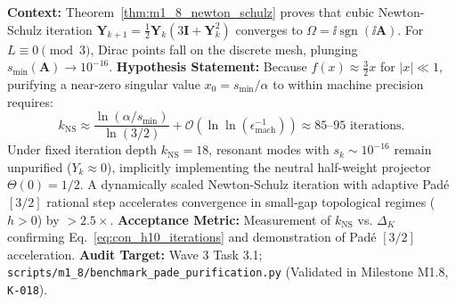 \begin{contract}
\label{con:h10_newton_schulz_complexity}
\textbf{Context:} Theorem~\ref{thm:m1_8_newton_schulz} proves that cubic Newton-Schulz iteration $\mathbf{Y}_{k+1} = \frac{1}{2}\mathbf{Y}_k(3\mathbf{I} + \mathbf{Y}_k^2)$ converges to $\Omega = \ii \operatorname{sgn}(\ii\mathbf{A})$. For $L \equiv 0 \pmod 3$, Dirac points fall on the discrete mesh, plunging $s_{\min}(\mathbf{A}) \to 10^{-16}$.
\textbf{Hypothesis Statement:} Because $f(x) \approx \frac{3}{2}x$ for $|x| \ll 1$, purifying a near-zero singular value $x_0 = s_{\min}/\alpha$ to within machine precision requires:
\begin{equation}
\label{eq:con_h10_iterations}
k_{\mathrm{NS}} \approx \frac{\ln(\alpha / s_{\min})}{\ln(3/2)} + \mathcal{O}(\ln\ln(\epsilon_{\mathrm{mach}}^{-1})) \approx 85\text{--}95 \text{ iterations}.
\end{equation}
Under fixed iteration depth $k_{\mathrm{NS}} = 18$, resonant modes with $s_k \sim 10^{-16}$ remain unpurified ($Y_k \approx 0$), implicitly implementing the neutral half-weight projector $\Theta(0) = 1/2$. A dynamically scaled Newton-Schulz iteration with adaptive Padé $[3/2]$ rational step accelerates convergence in small-gap topological regimes ($h > 0$) by $> 2.5\times$.
\textbf{Acceptance Metric:} Measurement of $k_{\mathrm{NS}}$ vs. $\Delta_K$ confirming Eq.~\eqref{eq:con_h10_iterations} and demonstration of Padé $[3/2]$ acceleration.
\textbf{Audit Target:} Wave 3 Task 3.1; \texttt{scripts/m1\_8/benchmark\_pade\_purification.py} (Validated in Milestone M1.8, \texttt{K-018}).
\end{contract}

